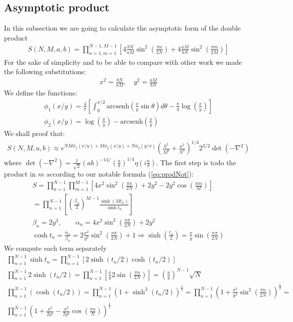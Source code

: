 \documentclass[12pt]{article}
\begin{document}
\subsection{Asymptotic product}
In this subsection we are going to calculate the asymptotic form of the double product
\begin{gather}
S(N,M,a,b)=\prod_{n=1,m=1}^{N-1,M-1}\left[4\frac{bN}{aM}\sin^2\left(\frac{\pi n}{2N}\right)+4\frac{aM}{bN}\sin^2\left(\frac{\pi m}{2M}\right)\right]
\end{gather}
For the sake of simplicity and to be able to compare with other work we made the following substitutions:
\begin{gather}
x^2=\frac{bN}{aM},\quad y^2=\frac{aM}{bN}
\end{gather}
We define the functions:
\begin{gather}
\phi_1(x/y)=\frac{4}{\pi}\left[\int_0^{\pi/2}\textrm{arcsenh}\left(\frac{x}{y}\sin \theta\right)d\theta-\frac{\pi}{4}\log\left(\frac{x}{y}\right)\right] \\
\phi_2(x/y)=\log\left(\frac{x}{y}\right)-\textrm{arcsenh}\left(\frac{x}{y}\right)
\end{gather}
We shall proof that:
\begin{gather}
S(N,M,a,b)\approx e^{NM\phi_1(x/y)+M\phi_2(x/y)+N\phi_2(y/x)}\left(\frac{b^2}{M^2}+\frac{a^2}{N^2}\right)^{1/4}2^{3/2} \det (-\nabla^2)
\end{gather}
where $\det (-\nabla^2)=\frac{1}{\sqrt{2}}(ab)^{-14/}\left(\frac{a}{b}\right)^{1/4}\eta\left(i\frac{a}{b}\right)$.
The first step is todo the product in $m$ according to our notable formula (\ref{eq:prodNot}):
\begin{gather}
S=\prod_{n=1}^{N-1}\prod_{m=1}^{M-1}\left[4x^2\sin^2\left(\frac{\pi n}{2N}\right)+2y^2-2y^2\cos\left(\frac{\pi m}{M}\right)\right]\nonumber\\=
\prod_{n=1}^{N-1}\left[\left(\frac{\beta_n}{2}\right)^{M-1}\frac{\sinh(Mt_n)}{\sinh t_n}\right] \\
\beta_n=2y^2,\qquad \alpha_n=4x^2\sin^2\left(\frac{n\pi}{2N}\right)+2y^2 \\
\cosh t_n=\frac{\alpha_n}{\beta_n}=2\frac{x^2}{y^2}\sin^2\left(\frac{n\pi}{2N}\right)+1\Rightarrow \sinh\left(\frac{t_n}{2}\right)=\frac{x}{y}\sin\left(\frac{n\pi}{2N}\right)
\end{gather}
We compute each term separately
\begin{gather}
\prod_{n=1}^{N-1}\sinh t_n=\prod_{n=1}^{N-1}\left[2\sinh (t_n/2)\cosh(t_n/2)\right] \\
\prod_{n=1}^{N-1} 2\sinh(t_n/2)=\prod_{n=1}^{N-1} \left[\frac{x}{y}2\sin\left(\frac{\pi n}{2N}\right)\right]=\left(\frac{x}{y}\right)^{N-1}\sqrt{N}\\
\prod_{n=1}^{N-1}\left(\cosh(t_n/2)\right)=\prod_{n=1}^{N-1}\left(1+\sinh^2(t_n/2)\right)^\frac{1}{2}=
\prod_{n=1}^{N-1}\left(1+\frac{x^2}{y^2}\sin^2\left(\frac{\pi n}{2N}\right)\right)^\frac{1}{2}=\nonumber \\
\prod_{n=1}^{N-1}\left(1+\frac{x^2}{2y^2}-\frac{x^2}{2y^2}\cos\left(\frac{\pi n}{N}\right)\right)^\frac{1}{2}
\end{gather}
\end{document}
